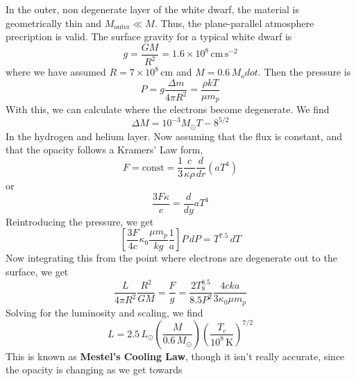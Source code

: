 \documentclass[10pt]{article}
\numberwithin{equation}{section}
\newcommand{\n}{\noindent}
\begin{document}
    \n In the outer, non degenerate layer of the white dwarf, the
    material is geometrically thin and $M_{\mathrm{outer}}\ll
    M$. Thus, the plane-parallel atmosphere precription is valid. The
    surface gravity for a typical white dwarf is
    \begin{equation}
      \label{eq:291}
      g=\frac{GM}{R^2}=1.6\times 10^8\,\mathrm{cm\,s^{-2}}
    \end{equation}
    where we have assumed $R=7\times 10^8\,\mathrm{cm}$ and
    $M=0.6\,M_odot$. Then the pressure is
    \begin{equation}
      \label{eq:292}
      P=g\frac{\Delta m}{4\pi R^2}=\frac{\rho kT}{\mu m_p}
    \end{equation}
    With this, we can calculate where the electrons become
    degenerate. We find
    \begin{equation}
      \label{eq:293}
      \Delta M=10^{-3}M_\odot T-8^{5/2}
    \end{equation}
    In the hydrogen and helium layer. Now assuming that the flux is
    constant, and that the opacity follows a Kramers' Law form,
    \begin{equation}
      \label{eq:294}
      F=\mathrm{const}=\frac{1}{3}\frac{c}{\kappa\rho}\frac{d}{dr}\left(aT^4\right)
    \end{equation}
    or
    \begin{equation}
      \label{eq:295}
      \frac{3F\kappa}{c}=\frac{d}{dy}aT^4
    \end{equation}
    Reintroducing the pressure, we get
    \begin{equation}
      \label{eq:296}
      \left[\frac{3F}{4c}\kappa_0\frac{\mu m_p}{k g}\frac{1}{a}\right]P\,dP=T^{7.5}\,dT
    \end{equation}
    Now integrating this from the point where electrons are degenerate
    out to the surface, we get
    \begin{equation}
      \label{eq:297}
      \frac{L}{4\pi R^2}\frac{R^2}{GM}=\frac{F}{g}=\frac{2
        T_8^{8.5}}{8.5 P^2}\frac{4c k a}{3 \kappa_0 \mu m_p}
    \end{equation}
    Solving for the luminosity and scaling, we find
    \begin{equation}
      \label{eq:298}
      \boxed{L=2.5\,L_\odot \left(\frac{M}{0.6\,M_\odot
          }\right)\left(\frac{T_c}{10^8 \,\mathrm{K}}\right)^{7/2}}
    \end{equation}
    This is known as \textbf{Mestel's Cooling Law}, though it isn't
    really accurate, since the opacity is changing as we get towards
\end{document}
